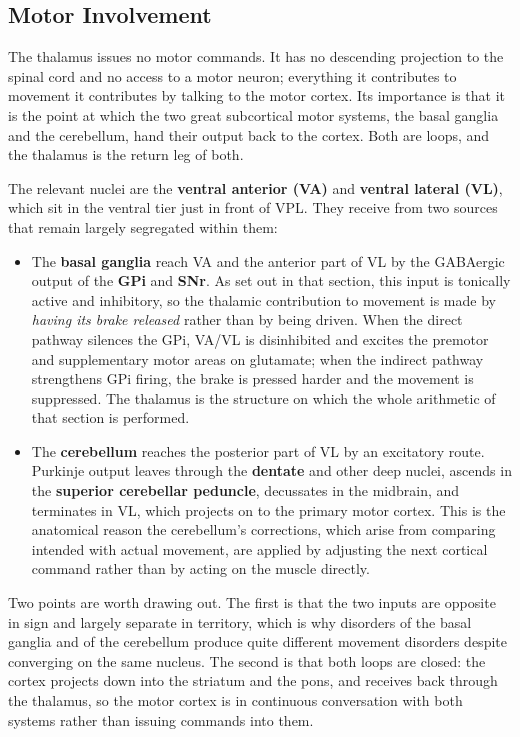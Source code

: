 \documentclass[11pt]{article}
\begin{document}
\subsection{Motor Involvement}

The thalamus issues no motor commands. It has no descending projection to the spinal cord and no access to a motor neuron; everything it contributes to movement it contributes by talking to the motor cortex. Its importance is that it is the point at which the two great subcortical motor systems, the basal ganglia and the cerebellum, hand their output back to the cortex. Both are loops, and the thalamus is the return leg of both.

The relevant nuclei are the \textbf{ventral anterior (VA)} and \textbf{ventral lateral (VL)}, which sit in the ventral tier just in front of VPL. They receive from two sources that remain largely segregated within them:

\begin{itemize}
    \item The \textbf{basal ganglia} reach VA and the anterior part of VL by the GABAergic output of the \textbf{GPi} and \textbf{SNr}. As set out in that section, this input is tonically active and inhibitory, so the thalamic contribution to movement is made by \textit{having its brake released} rather than by being driven. When the direct pathway silences the GPi, VA/VL is disinhibited and excites the premotor and supplementary motor areas on glutamate; when the indirect pathway strengthens GPi firing, the brake is pressed harder and the movement is suppressed. The thalamus is the structure on which the whole arithmetic of that section is performed.
    \item The \textbf{cerebellum} reaches the posterior part of VL by an excitatory route. Purkinje output leaves through the \textbf{dentate} and other deep nuclei, ascends in the \textbf{superior cerebellar peduncle}, decussates in the midbrain, and terminates in VL, which projects on to the primary motor cortex. This is the anatomical reason the cerebellum's corrections, which arise from comparing intended with actual movement, are applied by adjusting the next cortical command rather than by acting on the muscle directly.
\end{itemize}

Two points are worth drawing out. The first is that the two inputs are opposite in sign and largely separate in territory, which is why disorders of the basal ganglia and of the cerebellum produce quite different movement disorders despite converging on the same nucleus. The second is that both loops are closed: the cortex projects down into the striatum and the pons, and receives back through the thalamus, so the motor cortex is in continuous conversation with both systems rather than issuing commands into them.
\end{document}

